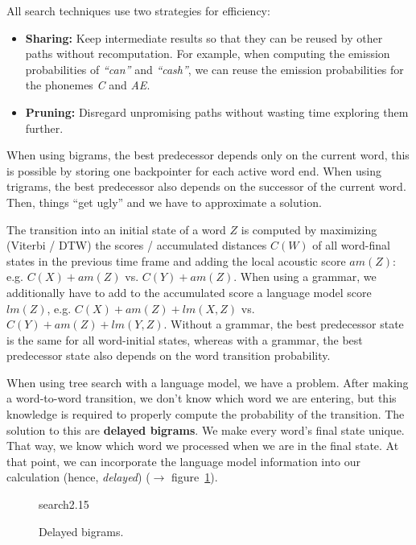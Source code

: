 \documentclass[11pt]{article}
\begin{document}
All search techniques use two strategies for efficiency:
\begin{itemize}
    \item \textbf{Sharing:} Keep intermediate results so that they can be reused by other paths without recomputation. For example, when computing the emission probabilities of \textit{``can''} and \textit{``cash''}, we can reuse the emission probabilities for the phonemes \textit{C} and \textit{AE}.
    \item \textbf{Pruning:} Disregard unpromising paths without wasting time exploring them further.
\end{itemize}

When using bigrams, the best predecessor depends only on the current word, this is possible by storing one backpointer for each active word end. When using trigrams, the best predecessor also depends on the successor of the current word. Then, things ``get ugly'' and we have to approximate a solution.

The transition into an initial state of a word $Z$ is computed by maximizing (Viterbi / DTW) the scores / accumulated distances $C(W)$ of all word-final states in the previous time frame and adding the local acoustic score $am(Z)$: e.g. $C(X) + am(Z)$ vs. $C(Y) + am(Z)$. When using a grammar, we additionally have to add to the accumulated score a language model score $lm(Z)$, e.g. $C(X) + am(Z) + lm(X, Z)$ vs. $C(Y) + am(Z) + lm(Y,Z)$. Without a grammar, the best predecessor state is the same for all word-initial states, whereas with a grammar, the best predecessor state also depends on the word transition probability.

\vspace{10pt}

When using tree search with a language model, we have a problem. After making a word-to-word transition, we don't know which word we are entering, but this knowledge is required to properly compute the probability of the transition. The solution to this are \textbf{delayed bigrams}. We make every word's final state unique. That way, we know which word we processed when we are in the final state. At that point, we can incorporate the language model information into our calculation (hence,
\textit{delayed}) ($\to$ figure~\ref{fig:delayedBigrams}).
\begin{figure}[htb]
    \begin{minipage}{\linewidth}
        \vspace{4cm}
        \hfill \scriptsize search2.15
    \end{minipage}
    \caption{\label{fig:delayedBigrams} Delayed bigrams.}
\end{figure}
\end{document}
